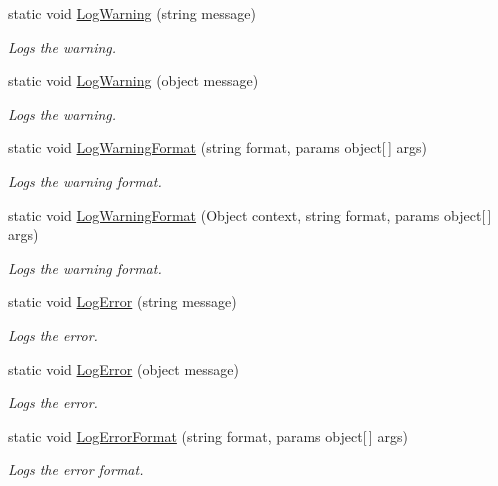 \begin{DoxyCompactItemize}
static void \hyperlink{class_lerp2_a_p_i_1_1___debug_1_1_debug_a6e5083b1ee7fc9a119f4dc2386a07d3c}{Log\+Warning} (string message)
\begin{DoxyCompactList}\small\item\em Logs the warning. \end{DoxyCompactList}\item 
static void \hyperlink{class_lerp2_a_p_i_1_1___debug_1_1_debug_ab35cb908e46adaa429a486083acc0a3d}{Log\+Warning} (object message)
\begin{DoxyCompactList}\small\item\em Logs the warning. \end{DoxyCompactList}\item 
static void \hyperlink{class_lerp2_a_p_i_1_1___debug_1_1_debug_a32f7d39f79f3d6172fa0386392a8608c}{Log\+Warning\+Format} (string format, params object\mbox{[}$\,$\mbox{]} args)
\begin{DoxyCompactList}\small\item\em Logs the warning format. \end{DoxyCompactList}\item 
static void \hyperlink{class_lerp2_a_p_i_1_1___debug_1_1_debug_ad50ef0f21af33bbe2b11b2ac6fd2be32}{Log\+Warning\+Format} (Object context, string format, params object\mbox{[}$\,$\mbox{]} args)
\begin{DoxyCompactList}\small\item\em Logs the warning format. \end{DoxyCompactList}\item 
static void \hyperlink{class_lerp2_a_p_i_1_1___debug_1_1_debug_a3ff51ae3944e1c7d217a89eb811049fc}{Log\+Error} (string message)
\begin{DoxyCompactList}\small\item\em Logs the error. \end{DoxyCompactList}\item 
static void \hyperlink{class_lerp2_a_p_i_1_1___debug_1_1_debug_aadfe952784e34731f7206db5ae5bef3c}{Log\+Error} (object message)
\begin{DoxyCompactList}\small\item\em Logs the error. \end{DoxyCompactList}\item 
static void \hyperlink{class_lerp2_a_p_i_1_1___debug_1_1_debug_a0361ce5d427e285c3c0ba0f4d8604971}{Log\+Error\+Format} (string format, params object\mbox{[}$\,$\mbox{]} args)
\begin{DoxyCompactList}\small\item\em Logs the error format. \end{DoxyCompactList}\item 

\end{DoxyCompactItemize}
